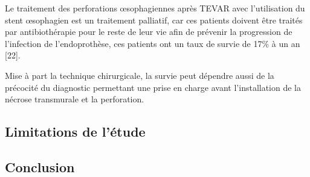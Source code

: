 \documentclass[./tfe.tex]{subfiles}
\begin{document}
Le traitement des perforations œsophagiennes après TEVAR avec l'utilisation du stent œsophagien est un traitement palliatif, car ces patients doivent être traités par antibiothérapie pour le reste de leur vie afin de prévenir la progression de l'infection de l'endoprothèse, ces patients ont un taux de survie de 17\% à un an [22].

Mise à part la technique chirurgicale, la survie peut dépendre aussi de la précocité du diagnostic permettant une prise en charge avant l’installation de la nécrose transmurale et la perforation.

\subsection*{Limitations de l’étude}


\subsection*{Conclusion}

\end{document}
